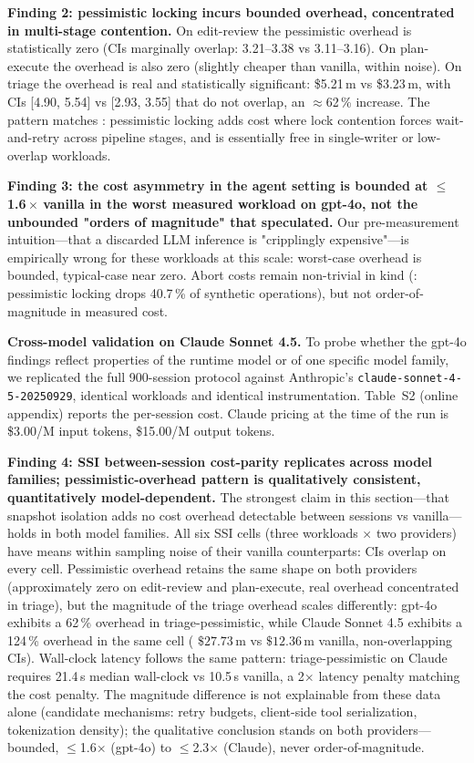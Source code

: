 \documentclass[journal,compsoc,10pt]{IEEEtran}
\theoremstyle{definition}
\theoremstyle{remark}
\begin{document}
\medskip
\noindent\textbf{Finding 2: pessimistic locking incurs bounded
overhead, concentrated in multi-stage contention.}
On edit-review the pessimistic overhead is statistically zero
(CIs marginally overlap: 3.21--3.38 vs 3.11--3.16). On
plan-execute the overhead is also zero (slightly cheaper than
vanilla, within noise). On triage the overhead is real and
statistically significant: \$5.21\,m vs \$3.23\,m, with CIs
[4.90, 5.54] vs [2.93, 3.55] that do not overlap, an
$\approx$62\,\% increase. The pattern matches : pessimistic locking
adds cost where lock contention forces wait-and-retry across pipeline
stages, and is essentially free in single-writer or low-overlap
workloads.

\medskip
\noindent\textbf{Finding 3: the cost asymmetry in the agent
setting is bounded at $\leq$1.6\,$\times$ vanilla in the worst
measured workload on gpt-4o, not the unbounded "orders of
magnitude" that  speculated.}
Our pre-measurement intuition---that a discarded LLM inference is
"cripplingly expensive"---is empirically wrong for these workloads at
this scale: worst-case overhead is bounded, typical-case near zero.
Abort costs remain non-trivial in kind (:
pessimistic locking drops 40.7\,\% of synthetic operations), but not
order-of-magnitude in measured cost.

\medskip
\noindent\textbf{Cross-model validation on Claude Sonnet 4.5.}
To probe whether the gpt-4o findings reflect properties of the
runtime model or of one specific model family, we replicated
the full 900-session protocol against Anthropic's
\texttt{claude-sonnet-4-5-20250929}, identical workloads and
identical instrumentation. Table~S2 (online appendix) reports the
per-session cost. Claude pricing at the time of the run is
\$3.00/M input tokens, \$15.00/M output tokens.


\medskip
\noindent\textbf{Finding 4: SSI between-session cost-parity replicates
across model families; pessimistic-overhead pattern is
qualitatively consistent, quantitatively model-dependent.}
The strongest claim in this section---that snapshot isolation
adds no cost overhead detectable between sessions vs vanilla---
holds in both model families. All six SSI cells (three
workloads $\times$ two providers) have means within sampling
noise of their vanilla counterparts: CIs overlap on every cell.
Pessimistic overhead retains the same shape on both providers
(approximately zero on edit-review and plan-execute, real
overhead concentrated in triage), but the magnitude of the
triage overhead scales differently: gpt-4o exhibits a 62\,\%
overhead in triage-pessimistic, while Claude Sonnet 4.5
exhibits a 124\,\% overhead in the same cell (
$\$27.73$\,m vs $\$12.36$\,m vanilla, non-overlapping CIs).
Wall-clock latency follows the same pattern: triage-pessimistic
on Claude requires 21.4\,s median wall-clock vs 10.5\,s
vanilla, a 2$\times$ latency penalty matching the cost penalty.
The magnitude difference is not explainable from these data alone
(candidate mechanisms: retry budgets, client-side tool serialization,
tokenization density); the qualitative conclusion stands on both
providers---bounded, $\leq$1.6$\times$ (gpt-4o) to $\leq$2.3$\times$
(Claude), never order-of-magnitude.
\end{document}
